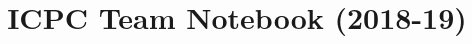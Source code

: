 \documentclass[9pt, a4paper]{article}
\title{\vspace{-4ex}\Large{ICPC Team Notebook (2018-19)}}
\author{}
\date{}
\begin{document}
\begin{landscape}
\begin{multicols*}{3}

\maketitle
\vspace{-13ex}
\tableofcontents
\pagestyle{fancy}



\end{multicols*}
\end{landscape}
\end{document}
